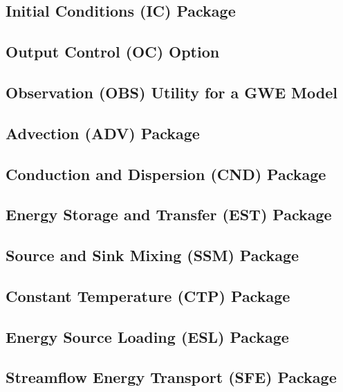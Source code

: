 \newpage
\subsection{Initial Conditions (IC) Package}


\newpage
\subsection{Output Control (OC) Option}


\newpage
\subsection{Observation (OBS) Utility for a GWE Model}


\newpage
\subsection{Advection (ADV) Package}


\newpage
\subsection{Conduction and Dispersion (CND) Package}


\newpage
\subsection{Energy Storage and Transfer (EST) Package}


\newpage
\subsection{Source and Sink Mixing (SSM) Package}


\newpage
\subsection{Constant Temperature (CTP) Package}


\newpage
\subsection{Energy Source Loading (ESL) Package}


\newpage
\subsection{Streamflow Energy Transport (SFE) Package}


